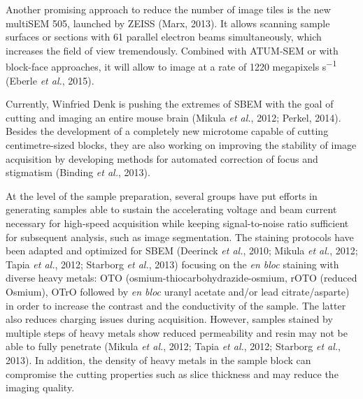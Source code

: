 \documentclass{article}
\begin{document}
Another promising approach to reduce the number of image tiles is the new multiSEM 505, launched by ZEISS (Marx, 2013). It allows scanning sample surfaces or sections with 61 parallel electron beams simultaneously, which increases the field of view tremendously. Combined with ATUM-SEM or with block-face approaches, it will allow to image at a rate of 1220 megapixels s\textsuperscript{−1} (Eberle \emph{et al.}, 2015).

Currently, Winfried Denk is pushing the extremes of SBEM with the goal of cutting and imaging an entire mouse brain (Mikula \emph{et al.}, 2012; Perkel, 2014). Besides the development of a completely new microtome capable of cutting centimetre-sized blocks, they are also working on improving the stability of image acquisition by developing methods for automated correction of focus and stigmatism (Binding \emph{et al.}, 2013).

At the level of the sample preparation, several groups have put efforts in generating samples able to sustain the accelerating voltage and beam current necessary for high-speed acquisition while keeping signal-to-noise ratio sufficient for subsequent analysis, such as image segmentation. The staining protocols have been adapted and optimized for SBEM (Deerinck \emph{et al.}, 2010; Mikula \emph{et al.}, 2012; Tapia \emph{et al.}, 2012; Starborg \emph{et al.}, 2013) focusing on the \emph{en bloc} staining with diverse heavy metals: OTO (osmium-thiocarbohydrazide-osmium, rOTO (reduced Osmium), OTrO followed by \emph{en bloc} uranyl acetate and/or lead citrate/asparte) in order to increase the contrast and the conductivity of the sample. The latter also reduces charging issues during acquisition. However, samples stained by multiple steps of heavy metals show reduced permeability and resin may not be able to fully penetrate (Mikula \emph{et al.}, 2012; Tapia \emph{et al.}, 2012; Starborg \emph{et al.}, 2013). In addition, the density of heavy metals in the sample block can compromise the cutting properties such as slice thickness and may reduce the imaging quality.
\end{document}
